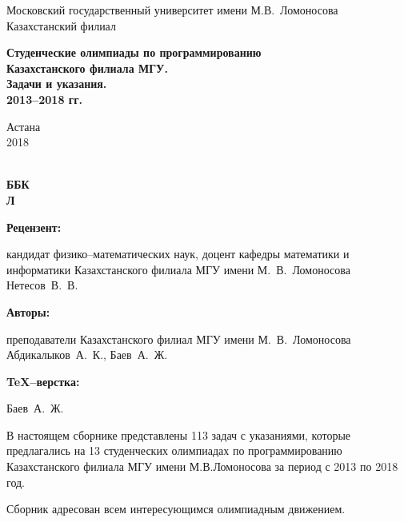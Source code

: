 \documentclass[11pt, a5paper]{article}
\begin{document}
\begin{titlepage}
\begin{center}
\vfill

Московский государственный университет имени М.В.~Ломоносова\\
Казахстанский филиал\\

\vfill

\begin{Large}
\textbf{Студенческие олимпиады по программированию\\
Казахстанского филиала МГУ. \\
Задачи и указания.\\
2013--2018 гг.\\
}
\end{Large}

\vfill

Астана\\
2018

\end{center}
\end{titlepage}

\setcounter{page}{2}


\thispagestyle{empty}

 \\
{\bf ББК}\\
{\bf Л}
\vspace{0.7 cm}

{\bf Рецензент:}

кандидат физико--математических наук, доцент кафедры математики и информатики Казахстанского филиала МГУ имени М.~В.~Ломоносова Нетесов~В.~В.

\vspace{0.5 cm}

{\bf Авторы:}

преподаватели Казахстанского филиал МГУ имени М.~В.~Ломоносова Абдикалыков~А.~К., Баев~А.~Ж.

\vspace{0.5 cm}

{\bf TeX--верстка:}

Баев~А.~Ж.

\vspace{0.5 cm}

В настоящем сборнике представлены 113 задач с указаниями, которые предлагались на 13 студенческих олимпиадах по программированию Казахстанского филиала МГУ имени М.В.Ломоносова за период с 2013 по 2018 год. 

Сборник  адресован  всем интересующимся олимпиадным движением.
\end{document}
